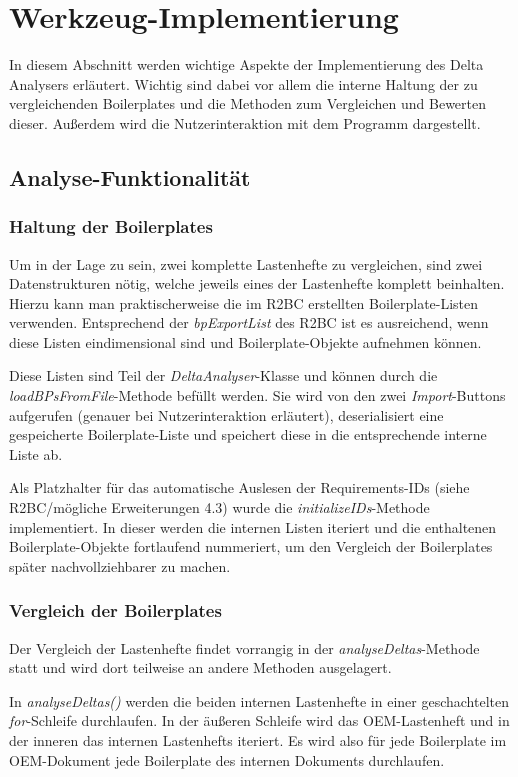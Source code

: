 \documentclass[12pt]{report}
\begin{document}
\section[Implementierung]{Werkzeug-Implementierung}
In diesem Abschnitt werden wichtige Aspekte der Implementierung des Delta Analysers erläutert. Wichtig sind dabei vor allem die interne Haltung der zu vergleichenden Boilerplates und die Methoden zum Vergleichen und Bewerten dieser. Außerdem wird die Nutzerinteraktion mit dem Programm dargestellt. 

\subsection{Analyse-Funktionalität}
\subsubsection{Haltung der Boilerplates}
Um in der Lage zu sein, zwei komplette Lastenhefte zu vergleichen, sind zwei Datenstrukturen nötig, welche jeweils eines der Lastenhefte komplett beinhalten. Hierzu kann man praktischerweise die im R2BC erstellten Boilerplate-Listen verwenden. Entsprechend der \textit{bpExportList} des R2BC ist es ausreichend, wenn diese Listen eindimensional sind und Boilerplate-Objekte aufnehmen können. 

Diese Listen sind Teil der \textit{DeltaAnalyser}-Klasse und können durch die \textit{loadBPsFromFile}-Methode befüllt werden. Sie wird von den zwei \textit{Import}-Buttons aufgerufen (genauer bei Nutzerinteraktion erläutert), deserialisiert eine gespeicherte Boilerplate-Liste und speichert diese in die entsprechende interne Liste ab.

Als Platzhalter für das automatische Auslesen der Requirements-IDs (siehe R2BC/mögliche Erweiterungen 4.3) wurde die \textit{initializeIDs}-Methode implementiert. In dieser werden die internen Listen iteriert und die enthaltenen Boilerplate-Objekte fortlaufend nummeriert, um den Vergleich der Boilerplates später nachvollziehbarer zu machen. 

\subsubsection{Vergleich der Boilerplates}
Der Vergleich der Lastenhefte findet vorrangig in der \textit{analyseDeltas}-Methode statt und wird dort teilweise an andere Methoden ausgelagert.

In \textit{analyseDeltas()} werden die beiden internen Lastenhefte in einer geschachtelten \textit{for}-Schleife durchlaufen. In der äußeren Schleife wird das OEM-Lastenheft und in der inneren das internen Lastenhefts iteriert. Es wird also für jede Boilerplate im OEM-Dokument jede Boilerplate des internen Dokuments durchlaufen. 
\end{document}
